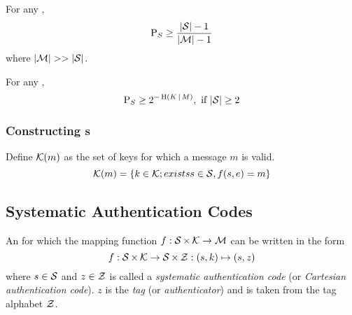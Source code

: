 \begin{theorem}\label{thm:Attack_Authentication_Code-Substitution-Success_Bounds}
  For any ,
  \begin{equation}\label{eq:Attack_Authentication_Code-Substitution-Success_Bound}
    \operatorname{\operatorname{P}}_{S} \geq \frac{\lvert \operatorname{\mathcal{S}} \rvert - 1}{\lvert \operatorname{\mathcal{M}} \rvert - 1}
  \end{equation}
  where $\lvert \operatorname{\mathcal{M}} \rvert >> \lvert \operatorname{\mathcal{S}} \rvert$.
\end{theorem}

\begin{theorem}\label{thm:Substitution-Simmons_Bound}
  For any ,
  \begin{equation}\label{eq:Substitution-Simmons_Bound}
    \operatorname{\operatorname{P}}_{S} \geq 2^{-\operatorname{\operatorname{H}}(K \operatorname{\vert} M)}, \text{ if } \lvert \operatorname{\mathcal{S}} \rvert \geq 2
  \end{equation}
\end{theorem}

\subsubsection{Constructing s}\label{subsubsec:Authentication_Code-Construction}
Define $\operatorname{\mathcal{K}}(m)$ as the set of keys for which a message $m$ is valid.
\begin{equation}\label{eq:Authentication_Code-Keys_Message_Valid}
  \operatorname{\mathcal{K}}(m) = \lbrace k \in \operatorname{\mathcal{K}}; exists s \in \operatorname{\mathcal{S}}, f(s, e) = m \rbrace
\end{equation}

\subsection{Systematic Authentication Codes}\label{subsec:Systematic_Authentication_Codes}
\begin{definition}\label{def:Systematic_Authentication_Code}
  An  for which the mapping function $f : \operatorname{\mathcal{S}} \times \operatorname{\mathcal{K}} \rightarrow \operatorname{\mathcal{M}}$ can be written in the form
  \begin{equation}\label{eq:Systematic_Authentication_Codes}
    f : \operatorname{\mathcal{S}} \times \operatorname{\mathcal{K}} \rightarrow \operatorname{\mathcal{S}} \times \operatorname{\mathcal{Z}} : (s, k) \mapsto (s, z)
  \end{equation}
  where $s \in \operatorname{\mathcal{S}}$ and $z \in \operatorname{\mathcal{Z}}$ is called a \emph{systematic authentication code} (or \emph{Cartesian authentication code}).
  $z$ is the \emph{tag} (or \emph{authenticator}) and is taken from the tag alphabet $\operatorname{\mathcal{Z}}$.
\end{definition}

